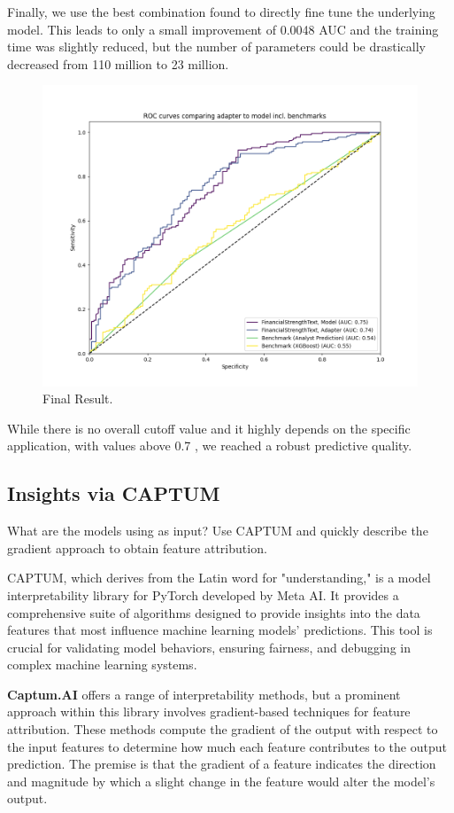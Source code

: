 \documentclass[conference]{IEEEtran}
\begin{document}
Finally, we use the best combination found to directly fine tune the underlying model. This leads to only a small improvement of 0.0048 AUC and the training time was slightly reduced, but the number of parameters could be drastically decreased from 110 million to 23 million.

\begin{figure}[H]
    \centering
    \includegraphics[width=.85\linewidth]{../3. evaluation/roc_curves/Fourth Experiment.png}
    \caption[Fourth Experiment]{Final Result.}
    \label{fig:Fourthexp}
\end{figure}

While there is no overall cutoff value and it highly depends on the specific application, with values above 0.7 \cite{Hosmer2013}, we reached a robust predictive quality.

\subsection{Insights via CAPTUM}%
What are the models using as input? Use CAPTUM and quickly describe the gradient approach to obtain feature attribution. \cite{Kokhlikyan2020}

CAPTUM, which derives from the Latin word for "understanding," is a model interpretability library for PyTorch developed by Meta AI. It provides a comprehensive suite of algorithms designed to provide insights into the data features that most influence machine learning models' predictions. This tool is crucial for validating model behaviors, ensuring fairness, and debugging in complex machine learning systems.

\textbf{Captum.AI} offers a range of interpretability methods, but a prominent approach within this library involves gradient-based techniques for feature attribution. These methods compute the gradient of the output with respect to the input features to determine how much each feature contributes to the output prediction. The premise is that the gradient of a feature indicates the direction and magnitude by which a slight change in the feature would alter the model's output.
\end{document}
